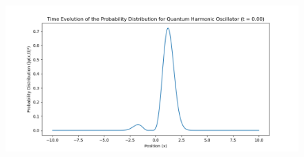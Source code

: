 \documentclass[12pt]{article}
\begin{document}
\begin{enumerate}
\begin{figure}[H]
            \centering
            \includegraphics[scale = 0.4]{1cfa701a935b4a9bb40477fd0d2ea1bbihXSCj8JTtwuve0d-0.png}\\ 
        \end{figure}

\end{enumerate}
\end{document}
